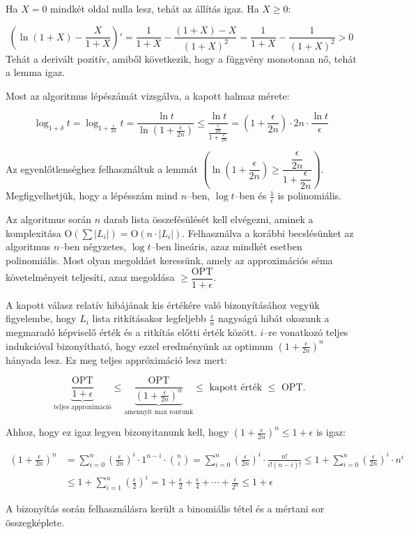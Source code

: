 Ha $X=0$ mindkét oldal nulla lesz, tehát az állítás igaz. Ha $X \geq 0$:

\[ \left( \ln{(1+X)} - \frac{X}{1+X}\right)' = \frac{1}{1+X} - \frac{(1+X)-X}{(1+X)^2} =
\frac{1}{1+X} - \frac{1}{(1+X)^2} > 0 
\]
Tehát a derivált pozitív, amiből következik, hogy a függvény monotonan nő, tehát
a lemma igaz.

Most az algoritmus lépészámát vizsgálva, a kapott halmaz mérete:

\[ \log_{1+\delta}{t}=\log_{1+\frac{\epsilon}{2n} }{t} = \frac{\ln{t}}{\ln(1+\frac{\epsilon}{2n})}
\leq \frac{\ln{t}}{\frac{\frac{\epsilon}{2n}}{1+\frac{\epsilon}{2n}}} 
= \left(1 + \frac{\epsilon}{2n} \right) \cdot 2n \cdot \frac{\ln{t}}{\epsilon} \]

Az egyenlőtlenséghez felhasználtuk a lemmát $\left(\ln(1+\dfrac{\epsilon}{2n})
\geq \dfrac{\dfrac{\epsilon}{2n}}{1+\dfrac{\epsilon}{2n}}\right)$.
Megfigyelhetjük, hogy a lépésszám mind $n$--ben, $\log t$--ben és
$\frac{1}{\epsilon}$ is polinomiális.

Az algoritmus során $n$ darab lista összefésülését kell elvégezni, aminek a
komplexitása O$(\sum |L_i|)=$O$(n \cdot |L_i|)$. Felhasználva a korábbi
becslésünket az algoritmus $n$--ben négyzetes, $\log{t}$--ben lineáris, azaz
mindkét esetben polinomiális. Most olyan megoldást keressünk, amely az
approximációs séma követelményeit teljesíti, azaz megoldása $\geq
\dfrac{\mbox{OPT}}{1+\epsilon}$.

A kapott válasz relatív hibájának kis értékére való bizonyításához vegyük
figyelembe, hogy $L_i$ lista ritkításakor legfeljebb $\frac{\epsilon}{n}$
nagyságú hibát okozunk a megmaradó képviselő érték és a ritkítás előtti érték
között. $i$--re vonatkozó teljes indukcióval bizonyítható, hogy ezzel
eredményünk az optimum $(1+ \frac{\epsilon}{2n})^n$ hányada lesz. Ez meg teljes
appróximáció lesz mert:

\[ \underbrace{\frac{\mbox{OPT}}{1+\epsilon}}_{\mbox{teljes approximáció}} \leq
\underbrace{\frac{\mbox{OPT}}{(1+ \frac{\epsilon}{2n})^n}}_{\mbox{amennyit max
rontunk}} \leq \mbox{ kapott érték } \leq \mbox{ OPT. }\]

Ahhoz, hogy ez igaz legyen bizonyitanunk kell, hogy $(1+\frac{\epsilon}{2n})^n
\leq 1 + \epsilon$ is igaz:

\begin{align*}
\left(1+\frac{\epsilon}{2n}\right)^n &= 
\sum_{i=0}^{n}\left(\frac{\epsilon}{2n}\right)^i \cdot 1^{n-i} \cdot \binom{n}{i} = 
 \sum_{i=0}^{n}\left(\frac{\epsilon}{2n}\right)^i \cdot \frac{n!}{i!(n-i)!}
 \leq 1 + \sum_{i=0}^{n}\left(\frac{\epsilon}{2n}\right)^i \cdot n^i \\
 &\leq 1 + \sum_{i=1}^{n}\left(\frac{\epsilon}{2}\right)^i = 1 + \frac{\epsilon}{2}
 + \frac{\epsilon}{4} + \cdots + \frac{\epsilon}{2^n} \leq 1 + \epsilon
\end{align*}

A bizonyítás során felhasználásra került a binomiális tétel és a mértani sor
összegképlete.
